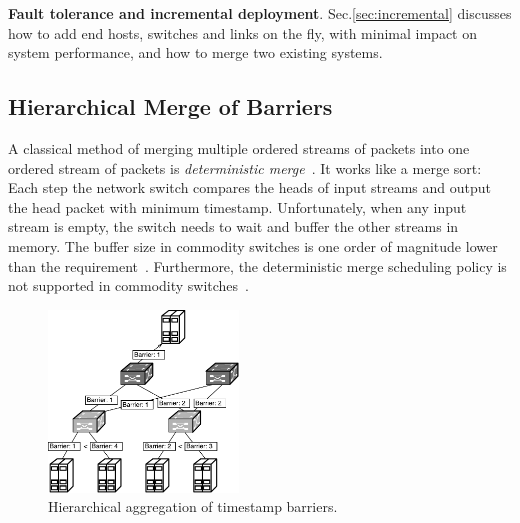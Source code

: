 \textbf{Fault tolerance and incremental deployment}.
Sec.\ref{sec:incremental} discusses how to add end hosts, switches and links on the fly, with minimal impact on system performance, and how to merge two existing \sys systems.



\subsection{Hierarchical Merge of Barriers}
\label{sec:ideal}

A classical method of merging multiple ordered streams of packets into one ordered stream of packets is \textit{deterministic merge}~\cite{hadzilacos1994modular, aguilera2000efficient}.
It works like a merge sort: Each step the network switch compares the heads of input streams and output the head packet with minimum timestamp. %
Unfortunately, when any input stream is empty, the switch needs to wait and buffer the other streams in memory.
The buffer size in commodity switches is one order of magnitude lower than the requirement~\cite{bai2017congestion}.
Furthermore, the deterministic merge scheduling policy is not supported in commodity switches~\cite{sivaraman2015towards,sivaraman2016programmable}.


\begin{figure}[t]
\centering
\includegraphics[width=0.45\textwidth]{images/hierarchical_merge.pdf}
\caption{Hierarchical aggregation of timestamp barriers.}
\label{fig:hierarchical_merge}
\vspace{-0.9em}
\end{figure}

